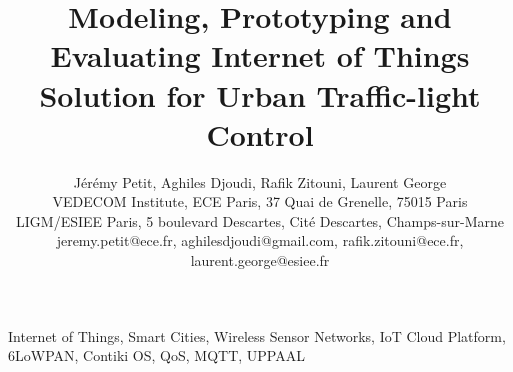 \documentclass[conference]{../../setup/IEEEtran}
\title{Modeling, Prototyping and Evaluating Internet of Things Solution for Urban Traffic-light Control}
\author{
		Jérémy Petit\Mark{1},
		Aghiles Djoudi\Mark{3}, 
		Rafik Zitouni\Mark{2}\Mark{3}, 
		Laurent George\Mark{3}\\
		
		\Mark{1} VEDECOM Institute, %
		\Mark{2} ECE Paris, 37 Quai de Grenelle, 75015 Paris \\
		\Mark{3} LIGM/ESIEE Paris, 5 boulevard Descartes, Cité Descartes, Champs-sur-Marne \\
		
		jeremy.petit@ece.fr, 
		aghilesdjoudi@gmail.com, 
		rafik.zitouni@ece.fr, 
		laurent.george@esiee.fr
}
\begin{document}
\maketitle



\begin{IEEEkeywords}
	Internet of Things, Smart Cities, Wireless Sensor Networks, IoT Cloud Platform, 6LoWPAN, Contiki OS, QoS, MQTT, UPPAAL
\end{IEEEkeywords}



\printbibliography
\end{document}

